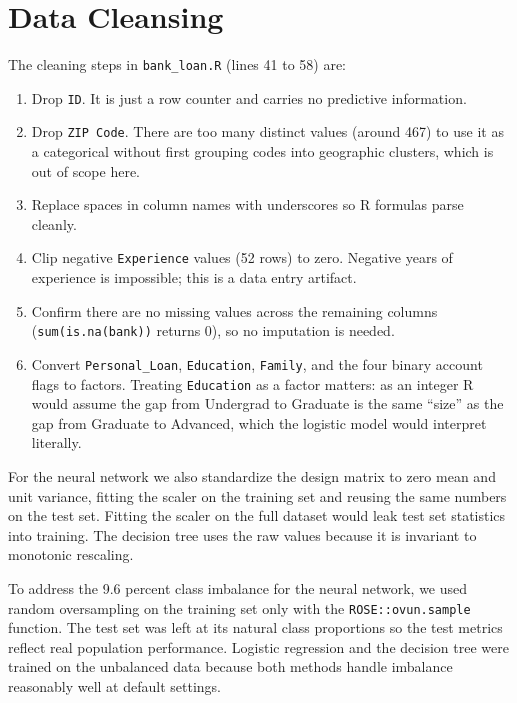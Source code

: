 \documentclass[11pt, a4paper]{article}
\begin{document}
\section{Data Cleansing}

The cleaning steps in \texttt{bank\_loan.R} (lines 41 to 58) are:

\begin{enumerate}[leftmargin=*, itemsep=4pt]
    \item Drop \texttt{ID}. It is just a row counter and carries no
          predictive information.
    \item Drop \texttt{ZIP Code}. There are too many distinct values
          (around 467) to use it as a categorical without first grouping
          codes into geographic clusters, which is out of scope here.
    \item Replace spaces in column names with underscores so R formulas
          parse cleanly.
    \item Clip negative \texttt{Experience} values (52 rows) to zero.
          Negative years of experience is impossible; this is a data entry
          artifact.
    \item Confirm there are no missing values across the remaining columns
          (\texttt{sum(is.na(bank))} returns 0), so no imputation is
          needed.
    \item Convert \texttt{Personal\_Loan}, \texttt{Education},
          \texttt{Family}, and the four binary account flags to factors.
          Treating \texttt{Education} as a factor matters: as an integer
          R would assume the gap from Undergrad to Graduate is the same
          ``size'' as the gap from Graduate to Advanced, which the
          logistic model would interpret literally.
\end{enumerate}

For the neural network we also standardize the design matrix to zero mean
and unit variance, fitting the scaler on the training set and reusing the
same numbers on the test set. Fitting the scaler on the full dataset would
leak test set statistics into training. The decision tree uses the raw
values because it is invariant to monotonic rescaling.

To address the 9.6 percent class imbalance for the neural network, we used
random oversampling on the training set only with the
\texttt{ROSE::ovun.sample} function. The test set was left at its natural
class proportions so the test metrics reflect real population performance.
Logistic regression and the decision tree were trained on the unbalanced
data because both methods handle imbalance reasonably well at default
settings.
\end{document}
